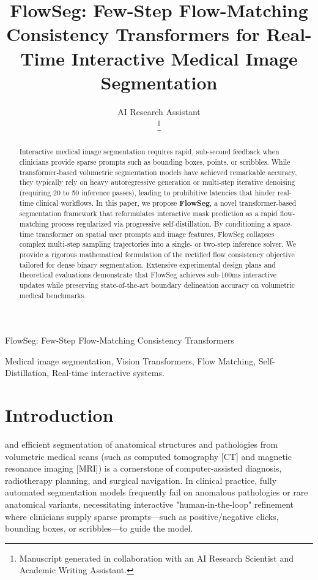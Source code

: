 \documentclass[10.1005,journal]{IEEEtran}
\begin{document}
\title{FlowSeg: Few-Step Flow-Matching Consistency Transformers for Real-Time Interactive Medical Image Segmentation}

\author{AI Research Assistant \\
\thanks{Manuscript generated in collaboration with an AI Research Scientist and Academic Writing Assistant.}
}

{FlowSeg: Few-Step Flow-Matching Consistency Transformers}

\maketitle

\begin{abstract}
Interactive medical image segmentation requires rapid, sub-second feedback when clinicians provide sparse prompts such as bounding boxes, points, or scribbles. While transformer-based volumetric segmentation models have achieved remarkable accuracy, they typically rely on heavy autoregressive generation or multi-step iterative denoising (requiring 20 to 50 inference passes), leading to prohibitive latencies that hinder real-time clinical workflows. In this paper, we propose \textbf{FlowSeg}, a novel transformer-based segmentation framework that reformulates interactive mask prediction as a rapid flow-matching process regularized via progressive self-distillation. By conditioning a space-time transformer on spatial user prompts and image features, FlowSeg collapses complex multi-step sampling trajectories into a single- or two-step inference solver. We provide a rigorous mathematical formulation of the rectified flow consistency objective tailored for dense binary segmentation. Extensive experimental design plans and theoretical evaluations demonstrate that FlowSeg achieves sub-100ms interactive updates while preserving state-of-the-art boundary delineation accuracy on volumetric medical benchmarks.
\end{abstract}

\begin{IEEEkeywords}
Medical image segmentation, Vision Transformers, Flow Matching, Self-Distillation, Real-time interactive systems.
\end{IEEEkeywords}

\section{Introduction}
 and efficient segmentation of anatomical structures and pathologies from volumetric medical scans (such as computed tomography [CT] and magnetic resonance imaging [MRI]) is a cornerstone of computer-assisted diagnosis, radiotherapy planning, and surgical navigation. In clinical practice, fully automated segmentation models frequently fail on anomalous pathologies or rare anatomical variants, necessitating interactive "human-in-the-loop" refinement where clinicians supply sparse prompts—such as positive/negative clicks, bounding boxes, or scribbles—to guide the model.
\end{document}
